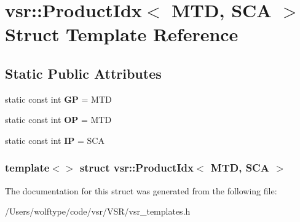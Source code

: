\hypertarget{structvsr_1_1_product_idx_3_01_m_t_d_00_01_s_c_a_01_4}{\section{vsr\-:\-:Product\-Idx$<$ M\-T\-D, S\-C\-A $>$ Struct Template Reference}
\label{structvsr_1_1_product_idx_3_01_m_t_d_00_01_s_c_a_01_4}
}
\subsection*{Static Public Attributes}
\begin{DoxyCompactItemize}
\item 
\hypertarget{structvsr_1_1_product_idx_3_01_m_t_d_00_01_s_c_a_01_4_a8fcdba3f4a6c02836edb6ff4f7db6fb2}{static const int {\bfseries G\-P} = M\-T\-D}\label{structvsr_1_1_product_idx_3_01_m_t_d_00_01_s_c_a_01_4_a8fcdba3f4a6c02836edb6ff4f7db6fb2}

\item 
\hypertarget{structvsr_1_1_product_idx_3_01_m_t_d_00_01_s_c_a_01_4_a4c1bf1155eeda95b28652c3a3ec783a7}{static const int {\bfseries O\-P} = M\-T\-D}\label{structvsr_1_1_product_idx_3_01_m_t_d_00_01_s_c_a_01_4_a4c1bf1155eeda95b28652c3a3ec783a7}

\item 
\hypertarget{structvsr_1_1_product_idx_3_01_m_t_d_00_01_s_c_a_01_4_a9947cc7db736e12f5114bcb1fce4c987}{static const int {\bfseries I\-P} = S\-C\-A}\label{structvsr_1_1_product_idx_3_01_m_t_d_00_01_s_c_a_01_4_a9947cc7db736e12f5114bcb1fce4c987}

\end{DoxyCompactItemize}
\subsubsection*{template$<$$>$ struct vsr\-::\-Product\-Idx$<$ M\-T\-D, S\-C\-A $>$}



The documentation for this struct was generated from the following file\-:\begin{DoxyCompactItemize}
\item 
/\-Users/wolftype/code/vsr/\-V\-S\-R/vsr\-\_\-templates.\-h\end{DoxyCompactItemize}
